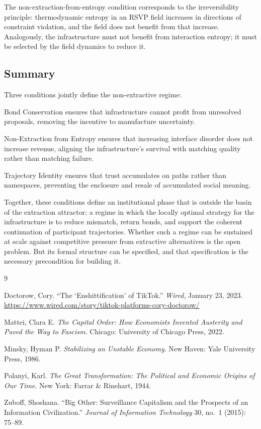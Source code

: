 \documentclass[12pt, a4paper]{article}
\begin{document}
The non-extraction-from-entropy condition corresponds to the irreversibility
principle: thermodynamic entropy in an RSVP field increases in directions of
constraint violation, and the field does not benefit from that increase.
Analogously, the infrastructure must not benefit from interaction entropy;
it must be selected by the field dynamics to reduce it.

\subsection{Summary}

Three conditions jointly define the non-extractive regime:

Bond Conservation ensures that infrastructure cannot profit from unresolved
proposals, removing the incentive to manufacture uncertainty.

Non-Extraction from Entropy ensures that increasing interface disorder does
not increase revenue, aligning the infrastructure's survival with matching
quality rather than matching failure.

Trajectory Identity ensures that trust accumulates on paths rather than
namespaces, preventing the enclosure and resale of accumulated social meaning.

Together, these conditions define an institutional phase that is outside the
basin of the extraction attractor: a regime in which the locally optimal
strategy for the infrastructure is to reduce mismatch, return bonds, and
support the coherent continuation of participant trajectories. Whether such a
regime can be sustained at scale against competitive pressure from extractive
alternatives is the open problem. But its formal structure can be specified,
and that specification is the necessary precondition for building it.

\vspace{2em}

\newpage
\begin{thebibliography}{9}

Doctorow, Cory. ``The `Enshittification' of TikTok.''
\textit{Wired}, January 23, 2023.
\url{https://www.wired.com/story/tiktok-platforms-cory-doctorow/}

Mattei, Clara E. \textit{The Capital Order: How Economists Invented Austerity
and Paved the Way to Fascism}. Chicago: University of Chicago Press, 2022.

Minsky, Hyman P. \textit{Stabilizing an Unstable Economy}.
New Haven: Yale University Press, 1986.

Polanyi, Karl. \textit{The Great Transformation: The Political and Economic
Origins of Our Time}. New York: Farrar \& Rinehart, 1944.

Zuboff, Shoshana. ``Big Other: Surveillance Capitalism and the Prospects of
an Information Civilization.'' \textit{Journal of Information Technology}
30, no.~1 (2015): 75--89.

\end{thebibliography}
\end{document}
